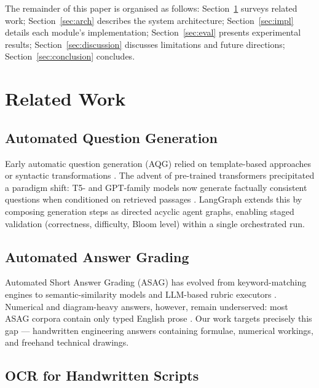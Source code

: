 \documentclass[conference]{IEEEtran}
\begin{document}
The remainder of this paper is organised as follows: Section~\ref{sec:related} surveys related work; Section~\ref{sec:arch} describes the system architecture; Section~\ref{sec:impl} details each module's implementation; Section~\ref{sec:eval} presents experimental results; Section~\ref{sec:discussion} discusses limitations and future directions; Section~\ref{sec:conclusion} concludes.

\section{Related Work}
\label{sec:related}

\subsection{Automated Question Generation}

Early automatic question generation (AQG) relied on template-based approaches \cite{lindberg2013generating} or syntactic transformations \cite{heilman2010good}. The advent of pre-trained transformers precipitated a paradigm shift: T5- and GPT-family models now generate factually consistent questions when conditioned on retrieved passages \cite{pan2019recent}. LangGraph \cite{langgraph2024} extends this by composing generation steps as directed acyclic agent graphs, enabling staged validation (correctness, difficulty, Bloom level) within a single orchestrated run.

\subsection{Automated Answer Grading}

Automated Short Answer Grading (ASAG) has evolved from keyword-matching engines \cite{burrows2015eras} to semantic-similarity models \cite{sultan2016fast} and LLM-based rubric executors \cite{guo2022automated}. Numerical and diagram-heavy answers, however, remain underserved: most ASAG corpora contain only typed English prose \cite{dzikovska2013semeval}. Our work targets precisely this gap — handwritten engineering answers containing formulae, numerical workings, and freehand technical drawings.

\subsection{OCR for Handwritten Scripts}
\end{document}
